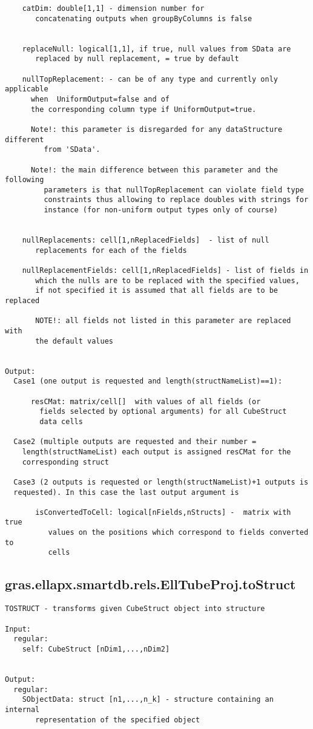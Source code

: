 \begin{verbatim}
    catDim: double[1,1] - dimension number for
       concatenating outputs when groupByColumns is false


    replaceNull: logical[1,1], if true, null values from SData are
       replaced by null replacement, = true by default

    nullTopReplacement: - can be of any type and currently only applicable
      when  UniformOutput=false and of
      the corresponding column type if UniformOutput=true.

      Note!: this parameter is disregarded for any dataStructure different
         from 'SData'.

      Note!: the main difference between this parameter and the following
         parameters is that nullTopReplacement can violate field type
         constraints thus allowing to replace doubles with strings for
         instance (for non-uniform output types only of course)


    nullReplacements: cell[1,nReplacedFields]  - list of null
       replacements for each of the fields

    nullReplacementFields: cell[1,nReplacedFields] - list of fields in
       which the nulls are to be replaced with the specified values,
       if not specified it is assumed that all fields are to be replaced

       NOTE!: all fields not listed in this parameter are replaced with
       the default values


Output:
  Case1 (one output is requested and length(structNameList)==1):

      resCMat: matrix/cell[]  with values of all fields (or
        fields selected by optional arguments) for all CubeStruct
        data cells

  Case2 (multiple outputs are requested and their number =
    length(structNameList) each output is assigned resCMat for the
    corresponding struct

  Case3 (2 outputs is requested or length(structNameList)+1 outputs is
  requested). In this case the last output argument is

       isConvertedToCell: logical[nFields,nStructs] -  matrix with true
          values on the positions which correspond to fields converted to
          cells
\end{verbatim}
\subsection{\texorpdfstring{gras.ellapx.smartdb.rels.EllTubeProj.toStruct}{toStruct}}\label{method:gras.ellapx.smartdb.rels.EllTubeProj.toStruct}
\begin{verbatim}
TOSTRUCT - transforms given CubeStruct object into structure

Input:
  regular:
    self: CubeStruct [nDim1,...,nDim2]


Output:
  regular:
    SObjectData: struct [n1,...,n_k] - structure containing an internal
       representation of the specified object
\end{verbatim}
